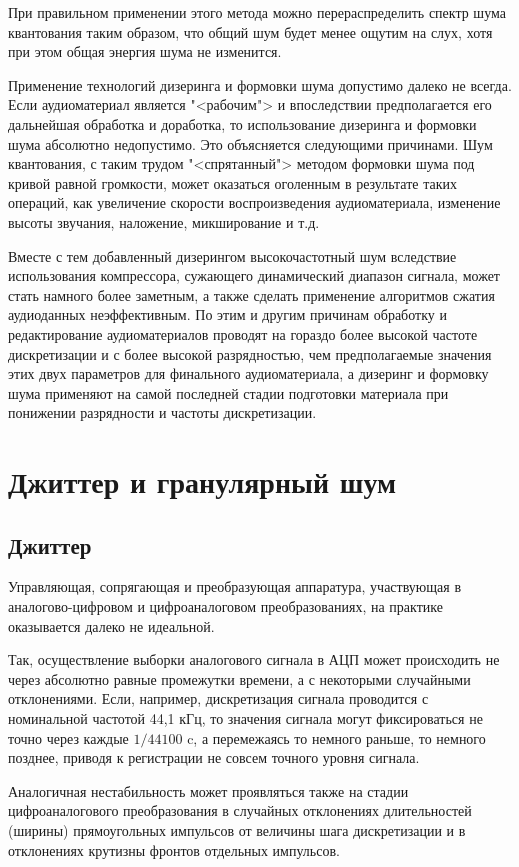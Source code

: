 \documentclass[oneside, final, 14pt]{extreport}
\begin{document}
При правильном применении этого метода можно перераспределить спектр шума квантования таким образом, что общий шум будет менее ощутим на слух, хотя при этом общая энергия шума не изменится.

Применение технологий дизеринга и формовки шума допустимо далеко не всегда. Если аудиоматериал является "<рабочим"> и впоследствии предполагается его дальнейшая обработка и доработка, то использование дизеринга и формовки шума абсолютно недопустимо. Это объясняется следующими причинами. Шум квантования, с таким трудом "<спрятанный"> методом формовки шума под кривой равной громкости, может оказаться оголенным в результате таких операций, как увеличение скорости воспроизведения аудиоматериала, изменение высоты звучания, наложение, микширование и т.д. 

Вместе с тем добавленный дизерингом высокочастотный шум вследствие использования компрессора, сужающего динамический диапазон сигнала, может стать намного более заметным, а также сделать применение алгоритмов сжатия аудиоданных неэффективным. По этим и другим причинам обработку и редактирование аудиоматериалов проводят на гораздо более высокой частоте дискретизации и с более высокой разрядностью, чем предполагаемые значения этих двух параметров для финального аудиоматериала, а дизеринг и формовку шума применяют на самой последней стадии подготовки материала при понижении разрядности и частоты дискретизации.

\section{Джиттер и гранулярный шум}
\subsection{Джиттер}

Управляющая, сопрягающая и преобразующая аппаратура, участвующая в аналогово-цифровом и цифроаналоговом преобразованиях, на практике оказывается далеко не идеальной.

Так, осуществление выборки аналогового сигнала в АЦП может происходить не через абсолютно равные промежутки времени, а с некоторыми случайными отклонениями. Если, например, дискретизация сигнала проводится с номинальной частотой 44,1 кГц, то значения сигнала могут фиксироваться не точно через каждые $1/44100$ c, а перемежаясь то немного раньше, то немного позднее, приводя к регистрации не совсем точного уровня сигнала.

Аналогичная нестабильность может проявляться также на стадии цифроаналогового преобразования в случайных отклонениях длительностей (ширины) прямоугольных импульсов от величины шага дискретизации и в отклонениях крутизны фронтов отдельных импульсов.
\end{document}
